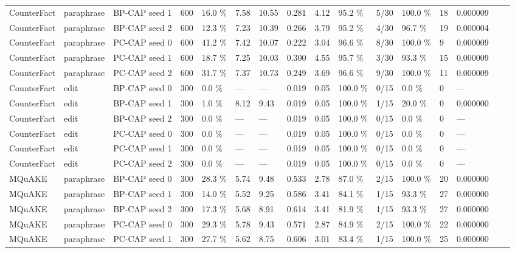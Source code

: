 \documentclass[10pt,a4paper]{article}
\begin{document}
\begin{center}
\begin{tabularx}{\textwidth}{@{}p{}XXXXXXXXXXXXXXX@{}}
CounterFact & paraphrase & BP-CAP seed 1 & 600 & 16.0 \% & 7.58 & 10.55 & 0.281 & 4.12 & 95.2 \% & 5/30 & 100.0 \% & 18 & 0.000009 &  &  \\
CounterFact & paraphrase & BP-CAP seed 2 & 600 & 12.3 \% & 7.23 & 10.39 & 0.266 & 3.79 & 95.2 \% & 4/30 & 96.7 \% & 19 & 0.000004 &  &  \\
CounterFact & paraphrase & PC-CAP seed 0 & 600 & 41.2 \% & 7.42 & 10.07 & 0.222 & 3.04 & 96.6 \% & 8/30 & 100.0 \% & 9 & 0.000009 &  &  \\
CounterFact & paraphrase & PC-CAP seed 1 & 600 & 18.7 \% & 7.25 & 10.03 & 0.300 & 4.55 & 95.7 \% & 3/30 & 93.3 \% & 15 & 0.000009 &  &  \\
CounterFact & paraphrase & PC-CAP seed 2 & 600 & 31.7 \% & 7.37 & 10.73 & 0.249 & 3.69 & 96.6 \% & 9/30 & 100.0 \% & 11 & 0.000009 &  &  \\
CounterFact & edit & BP-CAP seed 0 & 300 & 0.0 \% & — & — & 0.019 & 0.05 & 100.0 \% & 0/15 & 0.0 \% & 0 & — &  &  \\
CounterFact & edit & BP-CAP seed 1 & 300 & 1.0 \% & 8.12 & 9.43 & 0.019 & 0.05 & 100.0 \% & 1/15 & 20.0 \% & 0 & 0.000000 &  &  \\
CounterFact & edit & BP-CAP seed 2 & 300 & 0.0 \% & — & — & 0.019 & 0.05 & 100.0 \% & 0/15 & 0.0 \% & 0 & — &  &  \\
CounterFact & edit & PC-CAP seed 0 & 300 & 0.0 \% & — & — & 0.019 & 0.05 & 100.0 \% & 0/15 & 0.0 \% & 0 & — &  &  \\
CounterFact & edit & PC-CAP seed 1 & 300 & 0.0 \% & — & — & 0.019 & 0.05 & 100.0 \% & 0/15 & 0.0 \% & 0 & — &  &  \\
CounterFact & edit & PC-CAP seed 2 & 300 & 0.0 \% & — & — & 0.019 & 0.05 & 100.0 \% & 0/15 & 0.0 \% & 0 & — &  &  \\
MQuAKE & paraphrase & BP-CAP seed 0 & 300 & 28.3 \% & 5.74 & 9.48 & 0.533 & 2.78 & 87.0 \% & 2/15 & 100.0 \% & 20 & 0.000000 &  &  \\
MQuAKE & paraphrase & BP-CAP seed 1 & 300 & 14.0 \% & 5.52 & 9.25 & 0.586 & 3.41 & 84.1 \% & 1/15 & 93.3 \% & 27 & 0.000000 &  &  \\
MQuAKE & paraphrase & BP-CAP seed 2 & 300 & 17.3 \% & 5.68 & 8.91 & 0.614 & 3.41 & 81.9 \% & 1/15 & 93.3 \% & 27 & 0.000000 &  &  \\
MQuAKE & paraphrase & PC-CAP seed 0 & 300 & 29.3 \% & 5.78 & 9.43 & 0.571 & 2.87 & 84.9 \% & 2/15 & 100.0 \% & 22 & 0.000000 &  &  \\
MQuAKE & paraphrase & PC-CAP seed 1 & 300 & 27.7 \% & 5.62 & 8.75 & 0.606 & 3.01 & 83.4 \% & 1/15 & 100.0 \% & 25 & 0.000000 &  &  \\

\end{tabularx}
\end{center}
\end{document}

